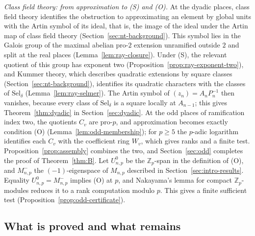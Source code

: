\documentclass[11pt]{article}
\theoremstyle{plain}
\theoremstyle{definition}
\theoremstyle{remark}
\newcommand{\Z}{\mathbb Z}
\begin{document}
\emph{Class field theory: from approximation to (S) and (O).}  At the
dyadic places, class field theory identifies the obstruction to
approximating an element by global units with the Artin symbol of its
ideal, that is, the image of the ideal under the Artin map of class field
theory (Section~\ref{sec:nt-background}).  This symbol lies in the Galois
group of the maximal abelian pro-$2$ extension unramified outside $2$ and
split at the real places (Lemma~\ref{lem:ray-closure}).  Under (S), the
relevant quotient of this group has exponent two
(Proposition~\ref{prop:ray-exponent-two}), and Kummer theory, which
describes quadratic extensions by square classes
(Section~\ref{sec:nt-background}), identifies its quadratic characters
with the classes of $\mathrm{Sel}_\delta$ (Lemma~\ref{lem:ray-selmer}).  The Artin symbol of
$(z_n)=A_nP_n^{-1}$ then vanishes, because every class of
$\mathrm{Sel}_\delta$ is a square locally at $A_{n-1}$; this gives
Theorem~\ref{thm:dyadic} in Section~\ref{sec:dyadic}.  At the odd places of
ramification index two, the quotients $C_v$ are pro-$p$, and
approximation becomes exactly condition (O)
(Lemma~\ref{lem:odd-membership}); for $p\ge5$ the $p$-adic logarithm
identifies each $C_v$ with the coefficient ring $W_v$, which gives ranks
and a finite test.  Proposition~\ref{prop:assembly}
combines the two, and Section~\ref{sec:odd} completes the proof of
Theorem~\ref{thm:B}.  Let $U^0_{n,p}$ be the $\Z_p$-span in the
definition of (O), and $M^-_{n,p}$ the $(-1)$-eigenspace of $M_{n,p}$
described in Section~\ref{sec:intro-results}.
Equality $U^0_{n,p}=M^-_{n,p}$ implies (O) at $p$, and Nakayama's lemma for
compact $\Z_p$-modules reduces it to a rank computation modulo $p$.  This
gives a finite sufficient test (Proposition~\ref{prop:odd-certificate}).

\subsection{What is proved and what remains}\label{sec:intro-status}
\end{document}
